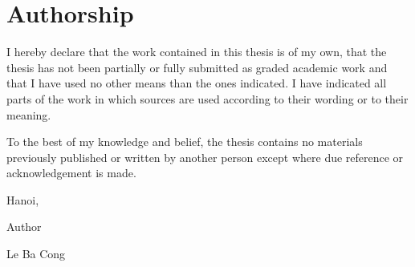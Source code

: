 \chapter*{Authorship}
\fontsize{13}{15}\selectfont
I hereby declare that the work contained in this thesis is of my own, that the thesis has not been partially or fully submitted as graded academic work and that I have used no other means than the ones indicated. I have indicated all parts of the work in which sources are used according to their wording or to their meaning. \par

To the best of my knowledge and belief, the thesis contains no materials previously published or written by another person except where due reference or acknowledgement is made. \par


\begin{flushright}
    Hanoi, \hspace*{2.8cm}              \par
    Author\hspace*{2.1cm}\par
    \par
    \par
    Le Ba Cong\hspace*{1.5cm}
\end{flushright}